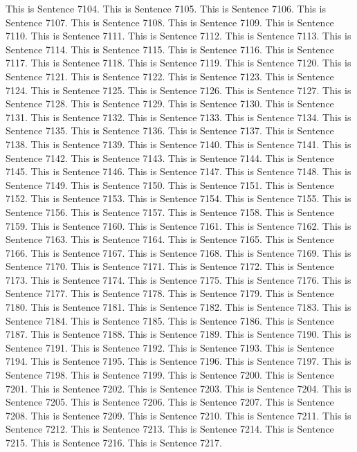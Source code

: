 \documentclass{article}
\begin{document}
This is Sentence 7104.
This is Sentence 7105.
This is Sentence 7106.
This is Sentence 7107.
This is Sentence 7108.
This is Sentence 7109.
This is Sentence 7110.
This is Sentence 7111.
This is Sentence 7112.
This is Sentence 7113.
This is Sentence 7114.
This is Sentence 7115.
This is Sentence 7116.
This is Sentence 7117.
This is Sentence 7118.
This is Sentence 7119.
This is Sentence 7120.
This is Sentence 7121.
This is Sentence 7122.
This is Sentence 7123.
This is Sentence 7124.
This is Sentence 7125.
This is Sentence 7126.
This is Sentence 7127.
This is Sentence 7128.
This is Sentence 7129.
This is Sentence 7130.
This is Sentence 7131.
This is Sentence 7132.
This is Sentence 7133.
This is Sentence 7134.
This is Sentence 7135.
This is Sentence 7136.
This is Sentence 7137.
This is Sentence 7138.
This is Sentence 7139.
This is Sentence 7140.
This is Sentence 7141.
This is Sentence 7142.
This is Sentence 7143.
This is Sentence 7144.
This is Sentence 7145.
This is Sentence 7146.
This is Sentence 7147.
This is Sentence 7148.
This is Sentence 7149.
This is Sentence 7150.
This is Sentence 7151.
This is Sentence 7152.
This is Sentence 7153.
This is Sentence 7154.
This is Sentence 7155.
This is Sentence 7156.
This is Sentence 7157.
This is Sentence 7158.
This is Sentence 7159.
This is Sentence 7160.
This is Sentence 7161.
This is Sentence 7162.
This is Sentence 7163.
This is Sentence 7164.
This is Sentence 7165.
This is Sentence 7166.
This is Sentence 7167.
This is Sentence 7168.
This is Sentence 7169.
This is Sentence 7170.
This is Sentence 7171.
This is Sentence 7172.
This is Sentence 7173.
This is Sentence 7174.
This is Sentence 7175.
This is Sentence 7176.
This is Sentence 7177.
This is Sentence 7178.
This is Sentence 7179.
This is Sentence 7180.
This is Sentence 7181.
This is Sentence 7182.
This is Sentence 7183.
This is Sentence 7184.
This is Sentence 7185.
This is Sentence 7186.
This is Sentence 7187.
This is Sentence 7188.
This is Sentence 7189.
This is Sentence 7190.
This is Sentence 7191.
This is Sentence 7192.
This is Sentence 7193.
This is Sentence 7194.
This is Sentence 7195.
This is Sentence 7196.
This is Sentence 7197.
This is Sentence 7198.
This is Sentence 7199.
This is Sentence 7200.
This is Sentence 7201.
This is Sentence 7202.
This is Sentence 7203.
This is Sentence 7204.
This is Sentence 7205.
This is Sentence 7206.
This is Sentence 7207.
This is Sentence 7208.
This is Sentence 7209.
This is Sentence 7210.
This is Sentence 7211.
This is Sentence 7212.
This is Sentence 7213.
This is Sentence 7214.
This is Sentence 7215.
This is Sentence 7216.
This is Sentence 7217.
\end{document}
